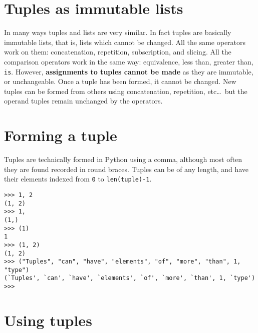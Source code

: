 \section{Tuples as immutable lists}

In many ways tuples and lists are very similar. In fact tuples are   basically immutable lists, that is, lists which cannot be changed. All   the same operators work on them: concatenation, repetition,   subscription, and slicing. All the comparison operators work in the   same way: equivalence, less than, greater than, \texttt{is}. However,   \textbf{assignments to tuples cannot be made} as they are   immutable, or unchangeable.  Once a tuple has been formed, it cannot be   changed. New tuples can be formed from others using concatenation,   repetition, etc\ldots\ but the operand tuples remain unchanged by the   operators.

\section{Forming a tuple}

Tuples are technically formed in Python using a comma, although most   often they are found recorded in round braces. Tuples can be of any   length, and have their elements indexed from \texttt{0} to \texttt{len(tuple)-1}.
\begin{lstlisting}
>>> 1, 2
(1, 2)
>>> 1, 
(1,)
>>> (1)
1
>>> (1, 2)
(1, 2)
>>> ("Tuples", "can", "have", "elements", "of", "more", "than", 1, "type")
(`Tuples', `can', `have', `elements', `of', `more', `than', 1, `type')
>>>
\end{lstlisting}

\section{Using tuples}

